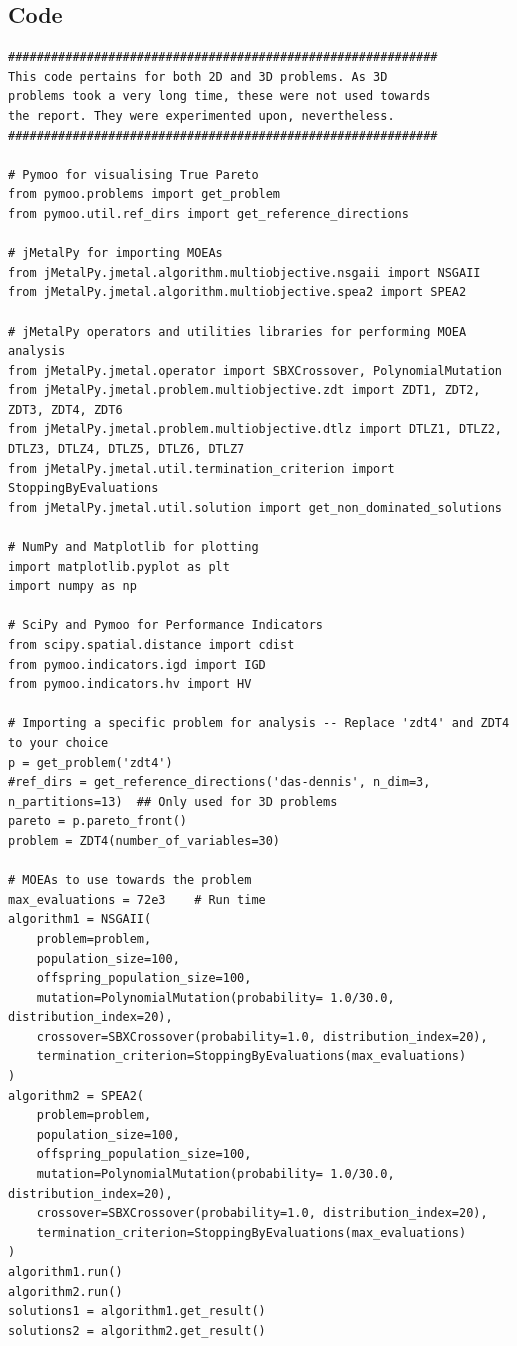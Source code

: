 \documentclass[sigconf, nonacm, preprint]{acmart}
\begin{document}
\subsection*{Code}
\begin{verbatim}
############################################################
This code pertains for both 2D and 3D problems. As 3D
problems took a very long time, these were not used towards
the report. They were experimented upon, nevertheless.
############################################################

# Pymoo for visualising True Pareto
from pymoo.problems import get_problem
from pymoo.util.ref_dirs import get_reference_directions

# jMetalPy for importing MOEAs
from jMetalPy.jmetal.algorithm.multiobjective.nsgaii import NSGAII
from jMetalPy.jmetal.algorithm.multiobjective.spea2 import SPEA2

# jMetalPy operators and utilities libraries for performing MOEA analysis
from jMetalPy.jmetal.operator import SBXCrossover, PolynomialMutation
from jMetalPy.jmetal.problem.multiobjective.zdt import ZDT1, ZDT2, ZDT3, ZDT4, ZDT6
from jMetalPy.jmetal.problem.multiobjective.dtlz import DTLZ1, DTLZ2, DTLZ3, DTLZ4, DTLZ5, DTLZ6, DTLZ7
from jMetalPy.jmetal.util.termination_criterion import StoppingByEvaluations
from jMetalPy.jmetal.util.solution import get_non_dominated_solutions

# NumPy and Matplotlib for plotting
import matplotlib.pyplot as plt
import numpy as np

# SciPy and Pymoo for Performance Indicators
from scipy.spatial.distance import cdist
from pymoo.indicators.igd import IGD
from pymoo.indicators.hv import HV

# Importing a specific problem for analysis -- Replace 'zdt4' and ZDT4 to your choice
p = get_problem('zdt4')
#ref_dirs = get_reference_directions('das-dennis', n_dim=3, n_partitions=13)  ## Only used for 3D problems
pareto = p.pareto_front()
problem = ZDT4(number_of_variables=30)

# MOEAs to use towards the problem
max_evaluations = 72e3    # Run time
algorithm1 = NSGAII(
    problem=problem,
    population_size=100,
    offspring_population_size=100,
    mutation=PolynomialMutation(probability= 1.0/30.0, distribution_index=20),
    crossover=SBXCrossover(probability=1.0, distribution_index=20),
    termination_criterion=StoppingByEvaluations(max_evaluations)
)
algorithm2 = SPEA2(
    problem=problem,
    population_size=100,
    offspring_population_size=100,
    mutation=PolynomialMutation(probability= 1.0/30.0, distribution_index=20),
    crossover=SBXCrossover(probability=1.0, distribution_index=20),
    termination_criterion=StoppingByEvaluations(max_evaluations)
)
algorithm1.run()
algorithm2.run()
solutions1 = algorithm1.get_result()
solutions2 = algorithm2.get_result()


\end{verbatim}
\end{document}
